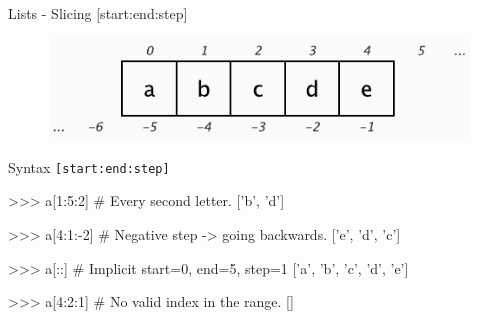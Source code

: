 \documentclass[10pt]{beamer}
\begin{document}
	
\begin{frame}[fragile]{Lists - Slicing [start:end:step]}
	
	\vspace*{-0.1cm}
	\begin{figure}[!h]
		\centering
		\includegraphics[width=0.6\linewidth]{img/slicing.pdf}		
	\end{figure}

	\vspace*{-0.3cm}
	\pause
	Syntax \small{\texttt{[start:end:step]}}
	
	\pause
	\begin{pythoncode}
		>>> a[1:5:2]  # Every second letter.
		['b', 'd']
	\end{pythoncode}
	
	\pause
	\begin{pythoncode}
		>>> a[4:1:-2]  # Negative step -> going backwards.
		['e', 'd', 'c']
	\end{pythoncode}
	
	\pause
	\begin{pythoncode}
		>>> a[::]  # Implicit start=0, end=5, step=1
		['a', 'b', 'c', 'd', 'e']
	\end{pythoncode}
	
	\pause
	\begin{pythoncode}
		>>> a[4:2:1]  # No valid index in the range.
		[]
	\end{pythoncode}		
\end{frame}
\end{document}
